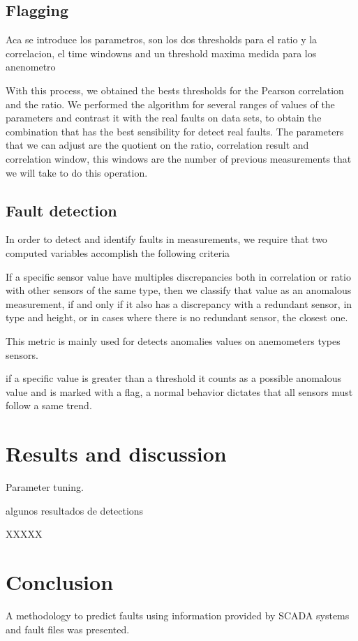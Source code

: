 \documentclass[journal]{IEEEtran}
\begin{document}
\subsection{Flagging} 
Aca se introduce los parametros, son los dos thresholds para el ratio y la correlacion, el time windowns and un threshold maxima medida para los anenometro


With this process, we obtained the bests thresholds for the Pearson correlation and the ratio. We performed the algorithm for several ranges of values of the parameters and contrast it with the real faults on data sets, to obtain the combination that has the best sensibility for detect real faults. The parameters that we can adjust are the quotient on the ratio, correlation result and correlation window, this windows are the number of previous measurements that we will take to do this operation.

\subsection{Fault detection}%
In order to detect and identify faults in measurements, we require that two computed variables accomplish the following criteria

If a specific sensor value have multiples discrepancies both in correlation or ratio with other sensors of the same type, then we classify that value as an anomalous measurement, if and only if it also has a discrepancy with a redundant sensor, in type and height, or in cases where there is no redundant sensor, the closest one.


This metric is mainly used for detects anomalies values on anemometers types sensors. 

if a specific value is greater than a threshold it counts as a possible anomalous value and is marked with a flag, a normal behavior dictates that all sensors must follow a same trend. 





\section{Results and discussion}\label{sec:results}
Parameter tuning.

algunos resultados de detections


XXXXX
\section{Conclusion}\label{sec:conclusion}
A methodology to predict  faults using information provided by SCADA systems and fault files was presented.



\end{document}
